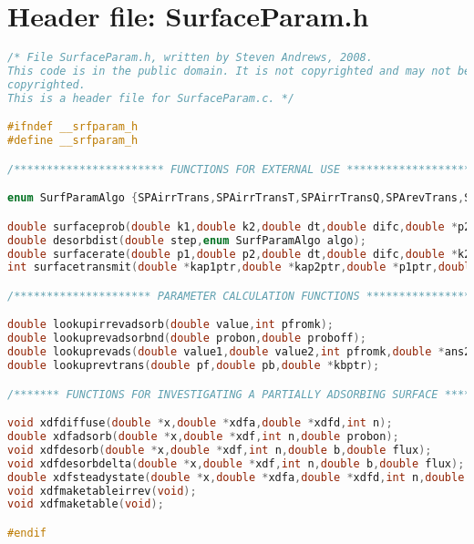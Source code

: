 \documentclass[11pt]{article}
\begin{document}
\maketitle

\section{Header file: SurfaceParam.h}

\begin{lstlisting}[language=C]
/* File SurfaceParam.h, written by Steven Andrews, 2008.
This code is in the public domain. It is not copyrighted and may not be
copyrighted.
This is a header file for SurfaceParam.c. */

#ifndef __srfparam_h
#define __srfparam_h

/*********************** FUNCTIONS FOR EXTERNAL USE ***********************/

enum SurfParamAlgo {SPAirrTrans,SPAirrTransT,SPAirrTransQ,SPArevTrans,SPAirrAds,SPAirrAdsT,SPAirrAdsQ,SPAirrAdsEC,SPArevAds,SPArevAdsND,SPAirrDes,SPArevDes,SPAirrFlip,SPArevFlip,SPAirrDesC,SPArevAdsC};

double surfaceprob(double k1,double k2,double dt,double difc,double *p2ptr,enum SurfParamAlgo algo);
double desorbdist(double step,enum SurfParamAlgo algo);
double surfacerate(double p1,double p2,double dt,double difc,double *k2ptr,enum SurfParamAlgo algo);
int surfacetransmit(double *kap1ptr,double *kap2ptr,double *p1ptr,double *p2ptr,double difc1,double difc2,double dt);

/********************* PARAMETER CALCULATION FUNCTIONS ********************/

double lookupirrevadsorb(double value,int pfromk);
double lookuprevadsorbnd(double probon,double proboff);
double lookuprevads(double value1,double value2,int pfromk,double *ans2ptr);
double lookuprevtrans(double pf,double pb,double *kbptr);

/******* FUNCTIONS FOR INVESTIGATING A PARTIALLY ADSORBING SURFACE *******/

void xdfdiffuse(double *x,double *xdfa,double *xdfd,int n);
double xdfadsorb(double *x,double *xdf,int n,double probon);
void xdfdesorb(double *x,double *xdf,int n,double b,double flux);
void xdfdesorbdelta(double *x,double *xdf,int n,double b,double flux);
double xdfsteadystate(double *x,double *xdfa,double *xdfd,int n,double cs,double b,double probon,double proboff,double eps);
void xdfmaketableirrev(void);
void xdfmaketable(void);

#endif
\end{lstlisting}
\end{document}
